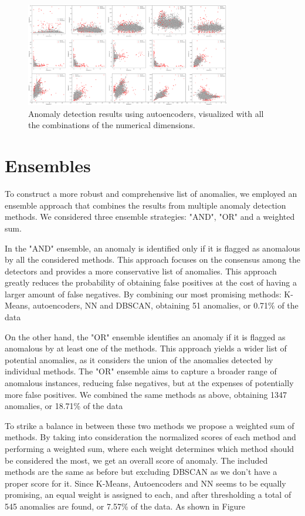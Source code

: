 \documentclass[9pt,twocolumn]{article}
\begin{document}
\begin{figure}[h]
    \centering
    \includegraphics[width=0.80\textwidth]{images/ED_floatdims.png}
    \caption{Anomaly detection results using autoencoders, visualized with all the combinations of the numerical dimensions.}
    \label{fig:autoencoders_alldims}
\end{figure}

\section{Ensembles}
To construct a more robust and comprehensive list of anomalies, we employed an ensemble approach that combines the results from multiple anomaly detection methods. We considered three ensemble strategies: "AND", "OR" and a weighted sum.

In the "AND" ensemble, an anomaly is identified only if it is flagged as anomalous by all the considered methods. This approach focuses on the consensus among the detectors and provides a more conservative list of anomalies. This approach greatly reduces the probability of obtaining false positives at the cost of having a larger amount of false negatives. By combining our most promising methods: K-Means, autoencoders, NN and DBSCAN, obtaining 51 anomalies, or 0.71\% of the data

On the other hand, the "OR" ensemble identifies an anomaly if it is flagged as anomalous by at least one of the methods. This approach yields a wider list of potential anomalies, as it considers the union of the anomalies detected by individual methods. The "OR" ensemble aims to capture a broader range of anomalous instances, reducing false negatives, but at the expenses of potentially more false positives. We combined the same methods as above, obtaining 1347 anomalies, or 18.71\% of the data

To strike a balance in between these two methods we propose a weighted sum of methods. By taking into consideration the normalized scores of each method and performing a weighted sum, where each weight determines which method should be considered the most, we get an overall score of anomaly. The included methods are the same as before but excluding DBSCAN as we don't have a proper score for it. Since K-Means, Autoencoders and NN seems to be equally promising, an equal weight is assigned to each, and after thresholding a total of 545 anomalies are found, or 7.57\% of the data. As shown in Figure 
\end{document}
